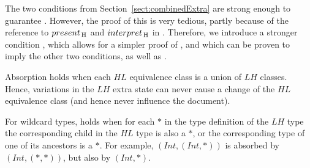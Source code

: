 The two conditions from Section~\ref{sect:combinedExtra} are strong enough to guarantee . However, the proof of this is very tedious, partly because of the reference to $present_{\, \mathrm H}$ and $interpret_{\, \mathrm H}$ in . Therefore, we introduce a stronger condition , which allows for a simpler proof of , and which can be proven to imply the other two conditions, as well as .



Absorption holds when each $HL$ equivalence class is a union of $LH$ classes. Hence, variations in the $LH$ extra state can never cause a change of the $HL$ equivalence class (and hence never influence the document). 

For wildcard types,  holds when for each $*$ in the type definition of the $LH$ type the corresponding child in the $HL$ type is also a $*$, or the corresponding type of one of its ancestors is a $*$.  For example, $(Int,(Int,*))$ is absorbed by $(Int,(*,*))$, but also by $(Int,*)$.


